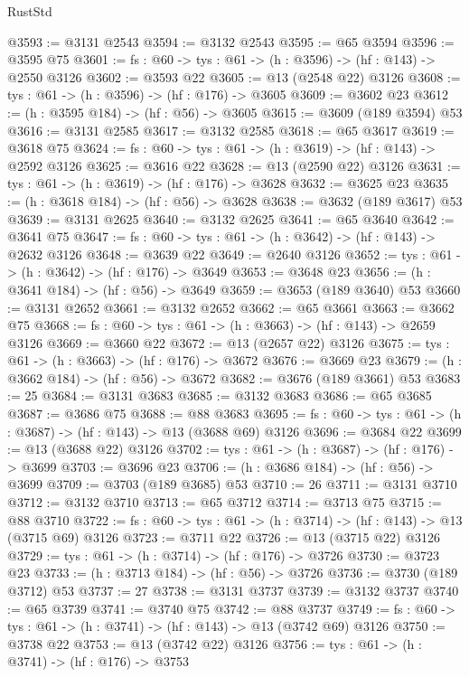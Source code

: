 \begin{lexlean}{RustStd}
\begin{coremodule}
@3593 := @3131 @2543
@3594 := @3132 @2543
@3595 := @65 @3594
@3596 := @3595 @75
@3601 := {fs : @60} -> {tys : @61} -> (h : @3596) -> (hf : @143) -> @2550 @3126
@3602 := @3593 @22
@3605 := @13 (@2548 @22) @3126
@3608 := {tys : @61} -> (h : @3596) -> (hf : @176) -> @3605
@3609 := @3602 @23
@3612 := (h : @3595 @184) -> (hf : @56) -> @3605
@3615 := @3609 (@189 @3594) @53
@3616 := @3131 @2585
@3617 := @3132 @2585
@3618 := @65 @3617
@3619 := @3618 @75
@3624 := {fs : @60} -> {tys : @61} -> (h : @3619) -> (hf : @143) -> @2592 @3126
@3625 := @3616 @22
@3628 := @13 (@2590 @22) @3126
@3631 := {tys : @61} -> (h : @3619) -> (hf : @176) -> @3628
@3632 := @3625 @23
@3635 := (h : @3618 @184) -> (hf : @56) -> @3628
@3638 := @3632 (@189 @3617) @53
@3639 := @3131 @2625
@3640 := @3132 @2625
@3641 := @65 @3640
@3642 := @3641 @75
@3647 := {fs : @60} -> {tys : @61} -> (h : @3642) -> (hf : @143) -> @2632 @3126
@3648 := @3639 @22
@3649 := @2640 @3126
@3652 := {tys : @61} -> (h : @3642) -> (hf : @176) -> @3649
@3653 := @3648 @23
@3656 := (h : @3641 @184) -> (hf : @56) -> @3649
@3659 := @3653 (@189 @3640) @53
@3660 := @3131 @2652
@3661 := @3132 @2652
@3662 := @65 @3661
@3663 := @3662 @75
@3668 := {fs : @60} -> {tys : @61} -> (h : @3663) -> (hf : @143) -> @2659 @3126
@3669 := @3660 @22
@3672 := @13 (@2657 @22) @3126
@3675 := {tys : @61} -> (h : @3663) -> (hf : @176) -> @3672
@3676 := @3669 @23
@3679 := (h : @3662 @184) -> (hf : @56) -> @3672
@3682 := @3676 (@189 @3661) @53
@3683 := 25
@3684 := @3131 @3683
@3685 := @3132 @3683
@3686 := @65 @3685
@3687 := @3686 @75
@3688 := @88 @3683
@3695 := {fs : @60} -> {tys : @61} -> (h : @3687) -> (hf : @143) -> @13 (@3688 @69) @3126
@3696 := @3684 @22
@3699 := @13 (@3688 @22) @3126
@3702 := {tys : @61} -> (h : @3687) -> (hf : @176) -> @3699
@3703 := @3696 @23
@3706 := (h : @3686 @184) -> (hf : @56) -> @3699
@3709 := @3703 (@189 @3685) @53
@3710 := 26
@3711 := @3131 @3710
@3712 := @3132 @3710
@3713 := @65 @3712
@3714 := @3713 @75
@3715 := @88 @3710
@3722 := {fs : @60} -> {tys : @61} -> (h : @3714) -> (hf : @143) -> @13 (@3715 @69) @3126
@3723 := @3711 @22
@3726 := @13 (@3715 @22) @3126
@3729 := {tys : @61} -> (h : @3714) -> (hf : @176) -> @3726
@3730 := @3723 @23
@3733 := (h : @3713 @184) -> (hf : @56) -> @3726
@3736 := @3730 (@189 @3712) @53
@3737 := 27
@3738 := @3131 @3737
@3739 := @3132 @3737
@3740 := @65 @3739
@3741 := @3740 @75
@3742 := @88 @3737
@3749 := {fs : @60} -> {tys : @61} -> (h : @3741) -> (hf : @143) -> @13 (@3742 @69) @3126
@3750 := @3738 @22
@3753 := @13 (@3742 @22) @3126
@3756 := {tys : @61} -> (h : @3741) -> (hf : @176) -> @3753

\end{coremodule}
\end{lexlean}

